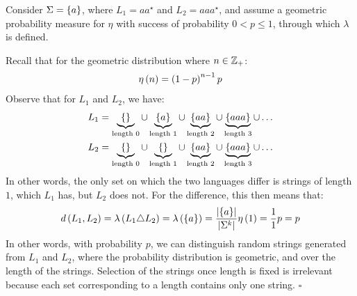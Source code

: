 \begin{example}
  Consider \(\Sigma = \left\{a\right\}\),
  where \(L_1 = aa^\star\) and \(L_2 = aaa^\star\),
  and assume a geometric probability measure for \(\eta\)
  with success of probability \(0 < p \leq 1\),
  through which \(\lambda\) is defined.

  Recall that for the geometric distribution where \(n \in \mathbb{Z}_{+}\):
  \begin{align*}
    \eta\left(n\right) = \left(1 - p\right)^{n - 1} p
  \end{align*}
  Observe that for \(L_1\) and \(L_2\), we have:
  \begin{align*}
    L_1 &=
      \underbrace{\left\{\right\}}_{\text{length \(0\)}} \cup
      \underbrace{\left\{a\right\}}_{\text{length \(1\)}} \cup
      \underbrace{\left\{aa\right\}}_{\text{length \(2\)}} \cup
      \underbrace{\left\{aaa\right\}}_{\text{length \(3\)}} \cup
      \ldots \\
    L_2 &= 
      \underbrace{\left\{\right\}}_{\text{length \(0\)}} \cup
      \underbrace{\left\{\right\}}_{\text{length \(1\)}} \cup
      \underbrace{\left\{aa\right\}}_{\text{length \(2\)}} \cup
      \underbrace{\left\{aaa\right\}}_{\text{length \(3\)}} \cup
      \ldots
  \end{align*}
  In other words, the only set on which the two languages differ is
  strings of length \(1\), which \(L_1\) has, but \(L_2\) does not.
  For the difference, this then means that:
  \begin{align*}
    d\left(L_1, L_2\right)
      = \lambda\left(L_1 \triangle L_2\right)
      = \lambda\left(\left\{a\right\}\right)
      = \frac{\left\lvert\left\{a\right\}\right\rvert}{\left\lvert\Sigma^k\right\rvert} \eta \left(1\right)
      = \frac{1}{1} p = p
  \end{align*}
  In other words, with probability \(p\),
  we can distinguish random strings generated from \(L_1\) and \(L_2\),
  where the probability distribution is geometric,
  and over the length of the strings.
  Selection of the strings once length is fixed is irrelevant because
  each set corresponding to a length contains only one string.
  \hfill\(\square\)
\end{example}
